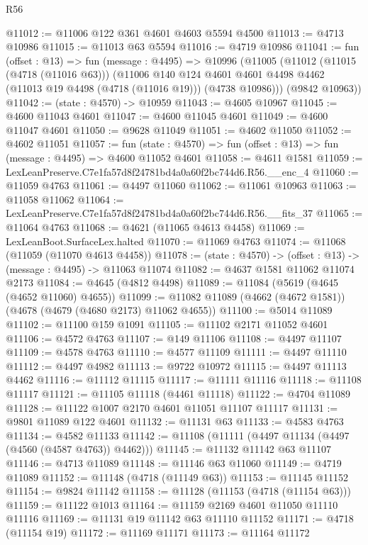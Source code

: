\begin{lexlean}{R56}
\begin{coremodule}
@11012 := @11006 @122 @361 @4601 @4603 @5594 @4500
@11013 := @4713 @10986
@11015 := @11013 @63 @5594
@11016 := @4719 @10986
@11041 := fun (offset : @13) =>
  fun (message : @4495) =>
  @10996
    (@11005
      (@11012
        (@11015 (@4718 (@11016 @63)))
        (@11006
          @140
          @124
          @4601
          @4601
          @4498
          @4462
          (@11013 @19 @4498 (@4718 (@11016 @19)))
          (@4738 @10986)))
      (@9842 @10963))
@11042 := (state : @4570) -> @10959
@11043 := @4605 @10967
@11045 := @4600 @11043 @4601
@11047 := @4600 @11045 @4601
@11049 := @4600 @11047 @4601
@11050 := @9628 @11049
@11051 := @4602 @11050
@11052 := @4602 @11051
@11057 := fun (state : @4570) => fun (offset : @13) => fun (message : @4495) => @4600 @11052 @4601
@11058 := @4611 @1581
@11059 := LexLeanPreserve.C7e1fa57d8f24781bd4a0a60f2bc744d6.R56.__enc_4
@11060 := @11059 @4763
@11061 := @4497 @11060
@11062 := @11061 @10963
@11063 := @11058 @11062
@11064 := LexLeanPreserve.C7e1fa57d8f24781bd4a0a60f2bc744d6.R56.__fits_37
@11065 := @11064 @4763
@11068 := @4621 (@11065 @4613 @4458)
@11069 := LexLeanBoot.SurfaceLex.halted
@11070 := @11069 @4763
@11074 := @11068 (@11059 (@11070 @4613 @4458))
@11078 := (state : @4570) -> (offset : @13) -> (message : @4495) -> @11063 @11074
@11082 := @4637 @1581 @11062 @11074 @2173
@11084 := @4645 (@4812 @4498)
@11089 := @11084 (@5619 (@4645 (@4652 @11060) @4655))
@11099 := @11082 @11089 (@4662 (@4672 @1581)) (@4678 (@4679 (@4680 @2173) @11062 @4655))
@11100 := @5014 @11089
@11102 := @11100 @159 @1091
@11105 := @11102 @2171 @11052 @4601
@11106 := @4572 @4763
@11107 := @149 @11106
@11108 := @4497 @11107
@11109 := @4578 @4763
@11110 := @4577 @11109
@11111 := @4497 @11110
@11112 := @4497 @4982
@11113 := @9722 @10972
@11115 := @4497 @11113 @4462
@11116 := @11112 @11115
@11117 := @11111 @11116
@11118 := @11108 @11117
@11121 := @11105 @11118 (@4461 @11118)
@11122 := @4704 @11089
@11128 := @11122 @1007 @2170 @4601 @11051 @11107 @11117
@11131 := @9801 @11089 @122 @4601
@11132 := @11131 @63
@11133 := @4583 @4763
@11134 := @4582 @11133
@11142 := @11108 (@11111 (@4497 @11134 (@4497 (@4560 (@4587 @4763)) @4462)))
@11145 := @11132 @11142 @63 @11107
@11146 := @4713 @11089
@11148 := @11146 @63 @11060
@11149 := @4719 @11089
@11152 := @11148 (@4718 (@11149 @63))
@11153 := @11145 @11152
@11154 := @9824 @11142
@11158 := @11128 (@11153 (@4718 (@11154 @63)))
@11159 := @11122 @1013
@11164 := @11159 @2169 @4601 @11050 @11110 @11116
@11169 := @11131 @19 @11142 @63 @11110 @11152
@11171 := @4718 (@11154 @19)
@11172 := @11169 @11171
@11173 := @11164 @11172

\end{coremodule}
\end{lexlean}
